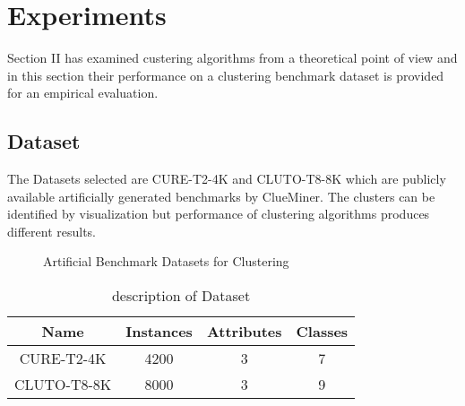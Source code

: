 
\section{Experiments}

Section II has examined custering algorithms from a theoretical point of view and in this section their performance on a clustering benchmark dataset is provided for an empirical evaluation.

\subsection{Dataset}

The Datasets selected are CURE-T2-4K and CLUTO-T8-8K which are publicly available artificially generated benchmarks by ClueMiner. The clusters can be identified by visualization but performance of clustering algorithms produces different results.




\begin{figure}[htbp]
\centering
\setlength{\lineskip}{\medskipamount}
\hfill
{}
\caption{Artificial Benchmark Datasets for Clustering} \label{fig:1}
\end{figure}


\begin{table}[H]
\renewcommand{\arraystretch}{1.3}
\caption{description of Dataset}
\label{table}
\centering
\begin{tabular}{|c|c|c|c|}
  \hline
\multicolumn{1}{|c|}{\textbf{Name}} & \multicolumn{1}{c|}{\textbf{ Instances}} & \multicolumn{1}{c|}{\textbf{ Attributes}} & \multicolumn{1}{c|}{\textbf{ Classes}}  \\
  \hline
  CURE-T2-4K & 4200 & 3 & 7\\
   \hline
   CLUTO-T8-8K & 8000 & 3 & 9\\
    \hline
\end{tabular}
\end{table}


